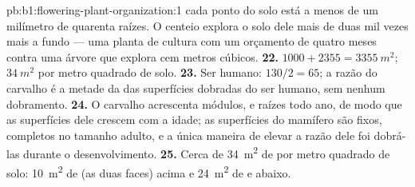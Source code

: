 \begin{solution}{pb:b1:flowering-plant-organization:1}
cada ponto do solo está a menos de um milímetro de quarenta raízes. O
centeio explora o solo dele mais de duas mil vezes mais a fundo --- uma
planta de cultura com um orçamento de quatro meses contra uma árvore que
explora cem metros cúbicos.
\textbf{22.} $1000 + 2355 = \qty{3355}{m^2}$; $\qty{34}{m^2}$ por metro
quadrado de solo.
\textbf{23.} Ser humano: $130/2 = 65$; a razão do carvalho é a metade da
das superfícies dobradas do ser humano, sem nenhum dobramento.
\textbf{24.} O carvalho acrescenta módulos,  e raízes todo ano, de
modo que as superfícies dele crescem com a idade; as superfícies do
mamífero são  fixos, completos no tamanho adulto, e a única
maneira de elevar a razão dele foi dobrá-las durante o desenvolvimento.
\textbf{25.} Cerca de \qty{34}{m^2} de  por metro
quadrado de solo: \qty{10}{m^2} de  (as duas faces) acima e
\qty{24}{m^2} de  e  abaixo.
\end{solution}
